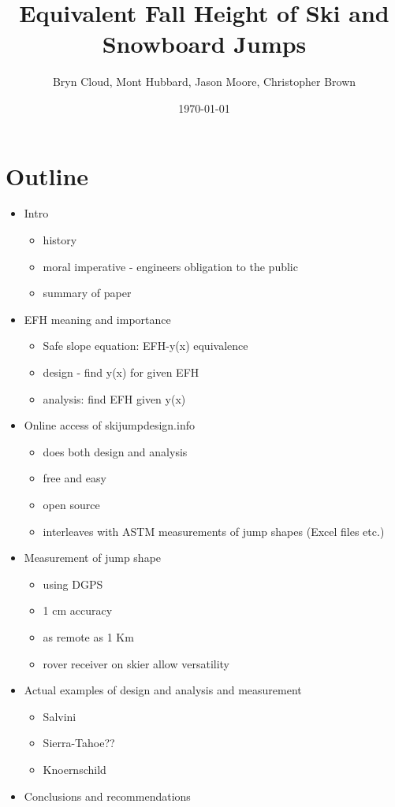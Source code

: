 \documentclass{article}
\title{Equivalent Fall Height of Ski and Snowboard Jumps}
\author{Bryn Cloud, Mont Hubbard, Jason Moore, Christopher Brown}
\date{\today}
\begin{document}
\maketitle

\section*{Outline}
%
\begin{itemize}
  \item Intro
  \begin{itemize}
    \item history
    \item moral imperative - engineers obligation to the public
    \item summary of paper
  \end{itemize}
  \item EFH meaning and importance
  \begin{itemize}
    \item Safe slope equation: EFH-y(x) equivalence
    \item design - find y(x) for given EFH
    \item analysis: find EFH given y(x)
  \end{itemize}
  \item Online access of skijumpdesign.info
  \begin{itemize}
    \item does both design and analysis
    \item free and easy
    \item open source
    \item interleaves with ASTM measurements of jump shapes (Excel files etc.)
  \end{itemize}
  \item Measurement of jump shape
  \begin{itemize}
    \item using DGPS
    \item 1 cm accuracy
    \item as remote as 1 Km
    \item rover receiver on skier allow versatility
  \end{itemize}
  \item Actual examples of design and analysis and measurement
  \begin{itemize}
    \item Salvini
    \item Sierra-Tahoe??
    \item Knoernschild
  \end{itemize}
  \item Conclusions and recommendations
\end{itemize}
\end{document}
